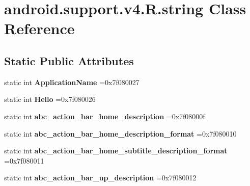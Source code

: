 \hypertarget{classandroid_1_1support_1_1v4_1_1R_1_1string}{}\section{android.\+support.\+v4.\+R.\+string Class Reference}
\label{classandroid_1_1support_1_1v4_1_1R_1_1string}
\subsection*{Static Public Attributes}
\begin{DoxyCompactItemize}
\item 
\mbox{\label{classandroid_1_1support_1_1v4_1_1R_1_1string_a772449695032c06613421b28711fa958}} 
static int {\bfseries Application\+Name} =0x7f080027
\item 
\mbox{\label{classandroid_1_1support_1_1v4_1_1R_1_1string_ad77cd57d81352d4392eaa9e15940dbdb}} 
static int {\bfseries Hello} =0x7f080026
\item 
\mbox{\label{classandroid_1_1support_1_1v4_1_1R_1_1string_a705812ef851cf8772aac05222adf470a}} 
static int {\bfseries abc\+\_\+action\+\_\+bar\+\_\+home\+\_\+description} =0x7f08000f
\item 
\mbox{\label{classandroid_1_1support_1_1v4_1_1R_1_1string_ac25eebd6c033bfd5964afe1b39b6e002}} 
static int {\bfseries abc\+\_\+action\+\_\+bar\+\_\+home\+\_\+description\+\_\+format} =0x7f080010
\item 
\mbox{\label{classandroid_1_1support_1_1v4_1_1R_1_1string_a9aa70a571ebcd82329f773809cf9af45}} 
static int {\bfseries abc\+\_\+action\+\_\+bar\+\_\+home\+\_\+subtitle\+\_\+description\+\_\+format} =0x7f080011
\item 
\mbox{\label{classandroid_1_1support_1_1v4_1_1R_1_1string_a55652b4f5ee75d8aa0e17e3a5c58f80f}} 
static int {\bfseries abc\+\_\+action\+\_\+bar\+\_\+up\+\_\+description} =0x7f080012
\item 

\end{DoxyCompactItemize}
